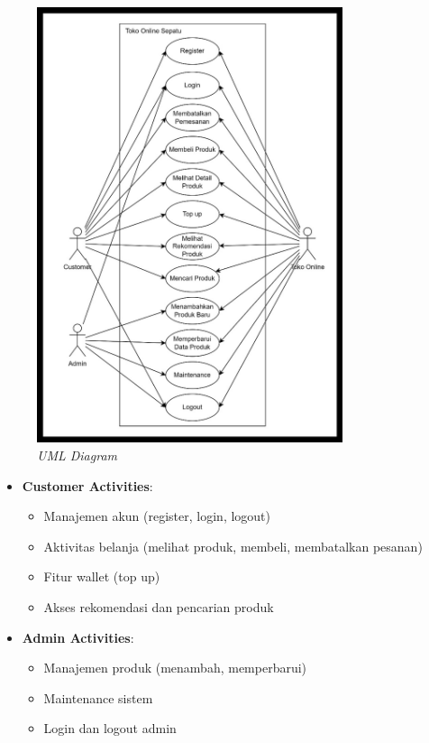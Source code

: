 \documentclass[journal,article,submit,pdftex,moreauthors]{Definitions/mdpi}
\begin{document}
\begin{figure}[H]
    \centering
    \includegraphics[width=0.8\textwidth]{images/UMLdiagram.jpeg}
     \captionsetup{justification=centering}
    \caption{\textit{UML Diagram}}
    \label{fig:enter-label}
\end{figure}
\begin{itemize}
    \item \textbf{Customer Activities}:
    \begin{itemize}
        \item Manajemen akun (register, login, logout)
        \item Aktivitas belanja (melihat produk, membeli, membatalkan pesanan)
        \item Fitur wallet (top up)
        \item Akses rekomendasi dan pencarian produk
    \end{itemize}
    
    \item \textbf{Admin Activities}:
    \begin{itemize}
        \item Manajemen produk (menambah, memperbarui)
        \item Maintenance sistem
        \item Login dan logout admin
    \end{itemize}
\end{itemize}
\end{document}
